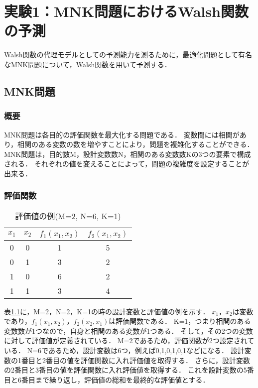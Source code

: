 \documentclass[main]{subfiles}
\begin{document}
\chapter{実験1：MNK問題におけるWalsh関数の予測}
    Walsh関数の代理モデルとしての予測能力を測るために，最適化問題として有名なMNK問題について，Walsh関数を用いて予測する．
    \section{MNK問題}
        \subsection{概要}
        MNK問題\cite{mnk}は各目的の評価関数を最大化する問題である．
        変数間には相関があり，相関のある変数の数を増やすことにより，問題を複雑化することができる．
        MNK問題は，目的数M，設計変数数N，相関のある変数数Kの3つの要素で構成される．
        それぞれの値を変えることによって，問題の複雑度を設定することが出来る．

        \subsection{評価関数}
        \begin{table}[h]
            \centering
            \caption{評価値の例(M=2, N=6, K=1)}
            \begin{tabular}{cc|cc}
              $x_1$ & $x_2$ & $f_1(x_1, x_2)$ & $f_2(x_1, x_2)$\\ \hline
              0 & 0 & 1 & 5 \\
              0 & 1 & 3 & 2 \\
              1 & 0 & 6 & 2 \\
              1 & 1 & 3 & 4 \\
            \end{tabular}
            \label{mnk_table}
        \end{table}
        表\ref{mnk_table}に，M=2，N=2，K=1の時の設計変数と評価値の例を示す．
        $x_1$，$x_2$は変数であり，$f_1(x_1, x_2)$，$f_2(x_2, x_1)$は評価関数である．
        K=1，つまり相関のある変数数が1つなので，自身と相関のある変数が1つある．
        そして，その2つの変数に対して評価値が定義されている．
        M=2であるため，評価関数が2つ設定されている．
        N=6であるため，設計変数は6つ，例えば0,1,0,1,0,1などになる．
        設計変数の1番目と2番目の値を評価関数に入れ評価値を取得する．
        さらに，設計変数の2番目と3番目の値を評価関数に入れ評価値を取得する．
        これを設計変数の5番目と6番目まで繰り返し，評価値の総和を最終的な評価値とする．
    
\end{document}
